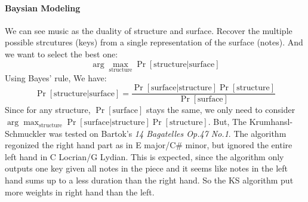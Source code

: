 \documentclass[12pt]{report}
\theoremstyle{definition}
\begin{document}
\paragraph*{Baysian Modeling}
We can see music as the duality of structure and surface.
Recover the multiple possible strcutures (keys) from a single representation of the surface (notes). And we want to select the best one:
\[\arg\max_{\text{structure}}\Pr[\text{structure}|\text{surface}]\]
Using Bayes' rule, We have:
\[\Pr[\text{structure}|\text{surface}]=\frac{\Pr[\text{surface}|\text{structure}]\Pr[\text{structure}]}{\Pr[\text{surface}]}\]
Since for any structure, $\Pr[\text{surface}]$ stays the same, 
we only need to consider \\$\arg\max_{\text{structure}}\Pr[\text{surface}|\text{structure}]\Pr[\text{structure}]$.
But, The Krumhansl-Schmuckler was tested on Bartok's \emph{14 Bagatelles Op.47 No.1}. The
algorithm regonized the right hand part as in E major/C\# minor, but ignored
the entire left hand in C Locrian/G Lydian. This is expected, since
the algorithm only outputs one key given all notes in the piece and 
it seems like notes in the left hand sums up to a less duration than
the right hand. So the KS algorithm put more weights in right hand than the
left. 
\end{document}
